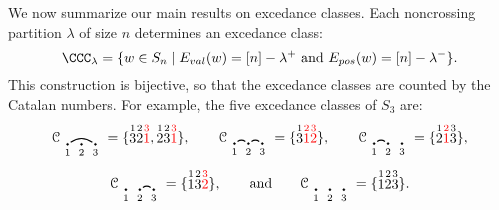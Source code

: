 \documentclass[submission]{FPSAC2024}
\theoremstyle{definition}
\theoremstyle{remark}
\numberwithin{equation}{section}
\renewcommand{\setminus}{-}
\newcommand{\EP}{E_{pos}}
\newcommand{\EV}{E_{val}}
\begin{document}
We now summarize our main results on excedance classes.  
Each noncrossing partition $\lambda$ of size $n$ determines an excedance class: 
\[
\CCC_{\lambda} = \{ w \in S_{n} \;|\;  \text{$\EV(w) = [n] \setminus \lambda^{+}$ and $\EP(w) = [n] \setminus \lambda^{-}$}  \}.
\]
This construction is bijective, so that the excedance classes are counted by the Catalan numbers.  For example, the five excedance classes of $S_{3}$ are:
\[
\mathcal{C}_{\begin{tikzpicture}[scale = 0.35, baseline = 0.35*-0.2]
\foreach \x in {1, ..., 3}{\draw[fill] (\x - 1, 0) circle (2pt) node[inner sep = 2pt] (\x) {};}
\foreach \x in {1, ..., 3}{\node[below] at (\x) {$\scriptstyle \x$};}
\foreach \i\j in {1/3}{\draw[thick] (\i) to[out = 35, in = 145] (\j);}
\end{tikzpicture}} = \{ \stackrel{1}{3}  \stackrel{2}{2} \color{red} \stackrel{3}{1} \color{black}, \stackrel{1}{2}\stackrel{2}{3} \color{red} \stackrel{3}{1} \color{black} \}, \qquad
\mathcal{C}_{\begin{tikzpicture}[scale = 0.35, baseline = 0.35*-0.2]
\foreach \x in {1, ..., 3}{\draw[fill] (\x - 1, 0) circle (2pt) node[inner sep = 2pt] (\x) {};}
\foreach \x in {1, ..., 3}{\node[below] at (\x) {$\scriptstyle \x$};}
\foreach \i\j in {1/2, 2/3}{\draw[thick] (\i) to[out = 35, in = 145] (\j);}
\end{tikzpicture}} = \{ \stackrel{1}{3} \color{red} \stackrel{2}{1} \stackrel{3}{2}  \color{black} \}, \qquad
\mathcal{C}_{\begin{tikzpicture}[scale = 0.35, baseline = 0.35*-0.2]
\foreach \x in {1, ..., 3}{\draw[fill] (\x - 1, 0) circle (2pt) node[inner sep = 2pt] (\x) {};}
\foreach \x in {1, ..., 3}{\node[below] at (\x) {$\scriptstyle \x$};}
\foreach \i\j in {1/2}{\draw[thick] (\i) to[out = 35, in = 145] (\j);}
\end{tikzpicture}} = \{\stackrel{1}{2}  \color{red} \stackrel{2}{1} \color{black}  \stackrel{3}{3}\}, 
\]
\[
\mathcal{C}_{\begin{tikzpicture}[scale = 0.35, baseline = 0.35*-0.2]
\foreach \x in {1, ..., 3}{\draw[fill] (\x - 1, 0) circle (2pt) node[inner sep = 2pt] (\x) {};}
\foreach \x in {1, ..., 3}{\node[below] at (\x) {$\scriptstyle \x$};}
\foreach \i\j in {2/3}{\draw[thick] (\i) to[out = 35, in = 145] (\j);}
\end{tikzpicture}} = \{\stackrel{1}{1} \stackrel{2}{3}  \color{red} \stackrel{3}{2} \color{black} \}, \qquad\text{and}\qquad
\mathcal{C}_{\begin{tikzpicture}[scale = 0.35, baseline = 0.35*-0.2]
\foreach \x in {1, ..., 3}{\draw[fill] (\x - 1, 0) circle (2pt) node[inner sep = 2pt] (\x) {};}
\foreach \x in {1, ..., 3}{\node[below] at (\x) {$\scriptstyle \x$};}
\end{tikzpicture}} = \{\stackrel{1}{1} \stackrel{2}{2} \stackrel{3}{3} \}.
\]
\end{document}
